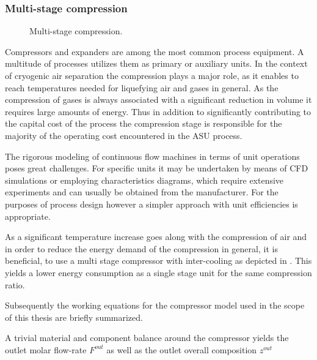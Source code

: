     \subsubsection{Multi-stage compression}
        \begin{figure}
            \center
            
            \caption{Multi-stage compression.}
            \label{fig:multi_stage_compression}
        \end{figure}

        Compressors and expanders are among the most common process equipment. A multitude of processes
        utilizes them as primary or auxiliary units. In the context of cryogenic air separation the
        compression plays a major role, as it enables to reach temperatures needed for liquefying
        air and gases in general. As the compression of gases is always associated with a significant
        reduction in volume it requires large amounts of energy. Thus in addition to significantly
        contributing to the capital cost of the process the compression stage is responsible for
        the majority of the operating cost encountered in the ASU process.

        The rigorous modeling of continuous flow machines in terms of unit operations poses great challenges.
        For specific units it may be undertaken by means of CFD simulations or employing characteristics diagrams,
        which require extensive experiments and can usually be obtained from the manufacturer.
        For the purposes of process design however a simpler approach with unit efficiencies is appropriate.

        As a significant temperature increase goes along with the compression of air and in order to reduce
        the energy demand of the compression in general, it is beneficial, to use a multi stage compressor with
        inter-cooling as depicted in . This yields a lower energy consumption
        as a single stage unit for the same compression ratio.

        Subsequently the working equations for the compressor model used in the scope of this thesis are
        briefly summarized.

        A trivial material and component balance around the compressor yields the outlet molar flow-rate $F^{out}$
        as well as the outlet overall composition $z^{out}$

